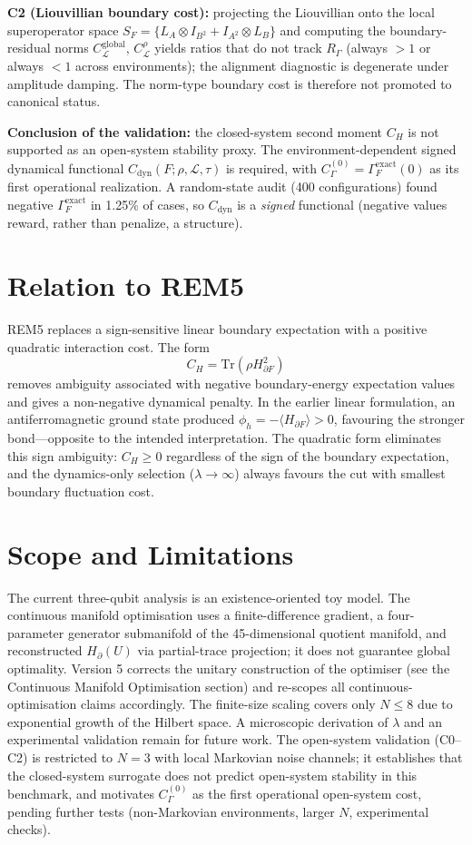 \documentclass[11pt]{article}
\begin{document}
\textbf{C2 (Liouvillian boundary cost):} projecting the Liouvillian onto the local superoperator space $S_F=\{L_A\otimes I_{B^2}+I_{A^2}\otimes L_B\}$ and computing the boundary-residual norms $C_{\mathcal L}^{\mathrm{global}}$, $C_{\mathcal L}^{\rho}$ yields ratios that do not track $R_\Gamma$ (always $>1$ or always $<1$ across environments); the alignment diagnostic is degenerate under amplitude damping. The norm-type boundary cost is therefore not promoted to canonical status.

\textbf{Conclusion of the validation:} the closed-system second moment $C_H$ is not supported as an open-system stability proxy. The environment-dependent signed dynamical functional $C_{\mathrm{dyn}}(F;\rho,\mathcal L,\tau)$ is required, with $C_\Gamma^{(0)}=\Gamma_F^{\mathrm{exact}}(0)$ as its first operational realization. A random-state audit (400 configurations) found negative $\Gamma_F^{\mathrm{exact}}$ in 1.25\% of cases, so $C_{\mathrm{dyn}}$ is a \emph{signed} functional (negative values reward, rather than penalize, a structure).

\section{Relation to REM5}
REM5 replaces a sign-sensitive linear boundary expectation with a positive quadratic interaction cost. The form
\[
C_H=\mathrm{Tr}(\rho H_{\partial F}^2)
\]
removes ambiguity associated with negative boundary-energy expectation values and gives a non-negative dynamical penalty. In the earlier linear formulation, an antiferromagnetic ground state produced $\phi_h = -\langle H_{\partial F}\rangle > 0$, favouring the stronger bond---opposite to the intended interpretation. The quadratic form eliminates this sign ambiguity: $C_H \geq 0$ regardless of the sign of the boundary expectation, and the dynamics-only selection ($\lambda\to\infty$) always favours the cut with smallest boundary fluctuation cost.

\section{Scope and Limitations}
The current three-qubit analysis is an existence-oriented toy model. The continuous manifold optimisation uses a finite-difference gradient, a four-parameter generator submanifold of the 45-dimensional quotient manifold, and reconstructed $H_{\partial}(U)$ via partial-trace projection; it does not guarantee global optimality. Version 5 corrects the unitary construction of the optimiser (see the Continuous Manifold Optimisation section) and re-scopes all continuous-optimisation claims accordingly. The finite-size scaling covers only $N\leq8$ due to exponential growth of the Hilbert space. A microscopic derivation of $\lambda$ and an experimental validation remain for future work. The open-system validation (C0--C2) is restricted to $N=3$ with local Markovian noise channels; it establishes that the closed-system surrogate does not predict open-system stability in this benchmark, and motivates $C_\Gamma^{(0)}$ as the first operational open-system cost, pending further tests (non-Markovian environments, larger $N$, experimental checks).
\end{document}
